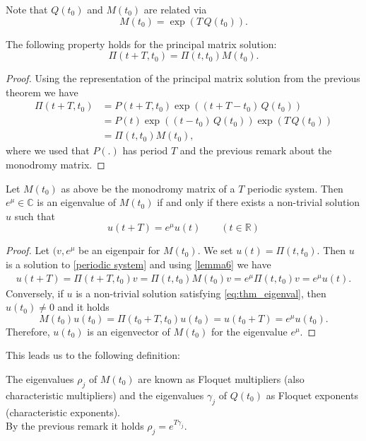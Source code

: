 \begin{rem}
    Note that $Q(t_0)$ and $M(t_0)$ are related via
    \[ M(t_0) = \exp(T\,Q(t_0)). \]
\end{rem}
\begin{lemma}\label{lemma6}
    The following property holds for the principal matrix solution:
    \[ \Pi(t+T,t_0) = \Pi(t,t_0)M(t_0).\]
\end{lemma}
\begin{proof}
    Using the representation of the principal matrix solution from the previous theorem we have
    \begin{align*}
        \Pi(t+T,t_0) &= P(t+T,t_0) \exp((t+T-t_0)\,Q(t_0))\\
        &= P(t) \exp((t-t_0)\,Q(t_0)) \exp(T\,Q(t_0))\\
        &= \Pi(t,t_0) M(t_0),
    \end{align*}
    where we used that $P(.)$ has period $T$ and the previous remark about the monodromy matrix.
\end{proof}




\begin{thm} \label{thm_eigenval}
    Let $M(t_0)$ as above be the monodromy matrix of a $T$ periodic system. Then $e^{\mu} \in \mathbb{C}$ is an eigenvalue of $M(t_0)$ if and only if there exists a non-trivial solution $u$ such that
    \begin{equation}
        u(t+T) = e^{\mu} u(t) \qquad (t \in \mathbb{R})\label{eq:thm_eigenval}
    \end{equation}
\end{thm}
\begin{proof}
    Let $(v,e^{\mu}$ be an eigenpair for $M(t_0)$. We set $u(t) = \Pi(t,t_0)$. Then $u$ is a solution to \eqref{periodic system} and using \eqref{lemma6} we have
    \begin{align*}
        u(t+T) = \Pi(t+T,t_0)v = \Pi(t,t_0) M(t_0)v = e^{\mu} \Pi(t,t_0) v = e^{\mu} u(t).
    \end{align*}
    Conversely, if $u$ is a non-trivial solution satisfying \eqref{eq:thm_eigenval}, then $u(t_0) \neq 0$ and it holds
    \[M(t_0)u(t_0) = \Pi(t_0 + T,t_0) u(t_0) = u(t_0+T) = e^{\mu} u(t_0).\]
    Therefore, $u(t_0)$ is an eigenvector of $M(t_0)$ for the eigenvalue $e^{\mu}$.
\end{proof}


This leads us to the following definition:
\begin{defn}
    The eigenvalues $\rho_j$ of $M(t_0)$  are known as Floquet multipliers (also characteristic multipliers) and the eigenvalues $\gamma_j$ of $Q(t_0)$ as Floquet exponents (characteristic exponents).\\
    By the previous remark it holds $\rho_j = e^{T \gamma_j}$.
\end{defn}










